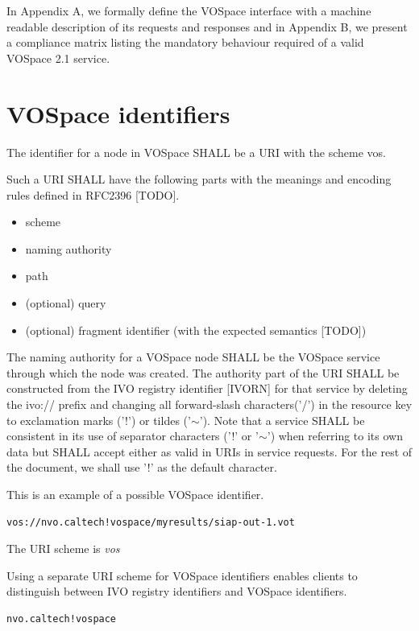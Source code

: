 \documentclass[11pt,a4paper]{ivoa}
\begin{document}
In Appendix A, we formally define the VOSpace interface with a machine readable description of its requests and responses and in Appendix B, we present a compliance matrix listing the mandatory behaviour required of a valid VOSpace 2.1 service.

\section{VOSpace identifiers}
\label{sec:vospace identifiers}
The identifier for a node in VOSpace SHALL be a URI with the scheme vos.

Such a URI SHALL have the following parts with the meanings and encoding rules defined in RFC2396 [TODO].

\begin{itemize}
  \item scheme
  \item naming authority
  \item path
  \item (optional) query
  \item (optional) fragment identifier (with the expected semantics [TODO])
\end{itemize}

The naming authority for a VOSpace node SHALL be the VOSpace service through which the node was created. The authority part of the URI SHALL be constructed from the IVO registry identifier [IVORN] for that service by deleting the ivo:// prefix and changing all forward-slash characters('/') in the resource key to exclamation marks ('!') or tildes ('$\mathtt{\sim}$'). Note that a service SHALL be consistent in its use of separator characters ('!' or '$\mathtt{\sim}$') when referring to its own data but SHALL accept either as valid in URIs in service requests. For the rest of the document, we shall use '!' as the default character.

This is an example of a possible VOSpace identifier.

\begin{verbatim}
vos://nvo.caltech!vospace/myresults/siap-out-1.vot
\end{verbatim}

The URI scheme is \emph{vos}

Using a separate URI scheme for VOSpace identifiers enables clients to distinguish between IVO registry identifiers and VOSpace identifiers.

\begin{verbatim}
nvo.caltech!vospace
\end{verbatim}
\end{document}
